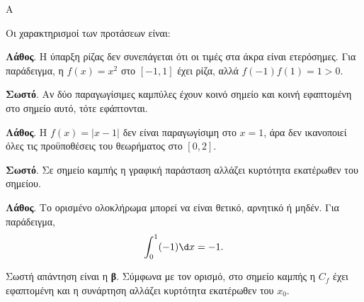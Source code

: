 \begin{thema}{Α}
\begin{erwthma}
\item {}

\item {}

\item {}

\item Οι χαρακτηρισμοί των προτάσεων είναι:
\begin{alist}
\item \textbf{Λάθος}. Η ύπαρξη ρίζας δεν συνεπάγεται ότι οι τιμές στα άκρα είναι ετερόσημες. Για παράδειγμα, η $f(x)=x^2$ στο $[-1,1]$ έχει ρίζα, αλλά $f(-1)f(1)=1>0$.
\item \textbf{Σωστό}. Αν δύο παραγωγίσιμες καμπύλες έχουν κοινό σημείο και κοινή εφαπτομένη στο σημείο αυτό, τότε εφάπτονται.
\item \textbf{Λάθος}. Η $f(x)=|x-1|$ δεν είναι παραγωγίσιμη στο $x=1$, άρα δεν ικανοποιεί όλες τις προϋποθέσεις του θεωρήματος  στο $[0,2]$.
\item \textbf{Σωστό}. Σε σημείο καμπής η γραφική παράσταση αλλάζει κυρτότητα εκατέρωθεν του σημείου.
\item \textbf{Λάθος}. Το ορισμένο ολοκλήρωμα μπορεί να είναι θετικό, αρνητικό ή μηδέν. Για παράδειγμα,
\[ \dint_0^1 (-1)\d x=-1. \]
\end{alist}

\item Σωστή απάντηση είναι η \textbf{β}. Σύμφωνα με τον ορισμό, στο σημείο καμπής η $C_f$ έχει εφαπτομένη και η συνάρτηση αλλάζει κυρτότητα εκατέρωθεν του $x_0$.
\end{erwthma}
\end{thema}


